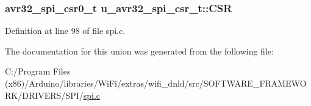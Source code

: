 \subsubsection[{C\+S\+R}]{\setlength{\rightskip}{0pt plus 5cm}avr32\+\_\+spi\+\_\+csr0\+\_\+t u\+\_\+avr32\+\_\+spi\+\_\+csr\+\_\+t\+::\+C\+S\+R}\label{unionu__avr32__spi__csr__t_a91cbf745f9d3075ad2c9f1bd628fc687}


Definition at line 98 of file spi.\+c.



The documentation for this union was generated from the following file\+:\begin{DoxyCompactItemize}
\item 
C\+:/\+Program Files (x86)/\+Arduino/libraries/\+Wi\+Fi/extras/wifi\+\_\+dnld/src/\+S\+O\+F\+T\+W\+A\+R\+E\+\_\+\+F\+R\+A\+M\+E\+W\+O\+R\+K/\+D\+R\+I\+V\+E\+R\+S/\+S\+P\+I/\hyperlink{spi_8c}{spi.\+c}\end{DoxyCompactItemize}

